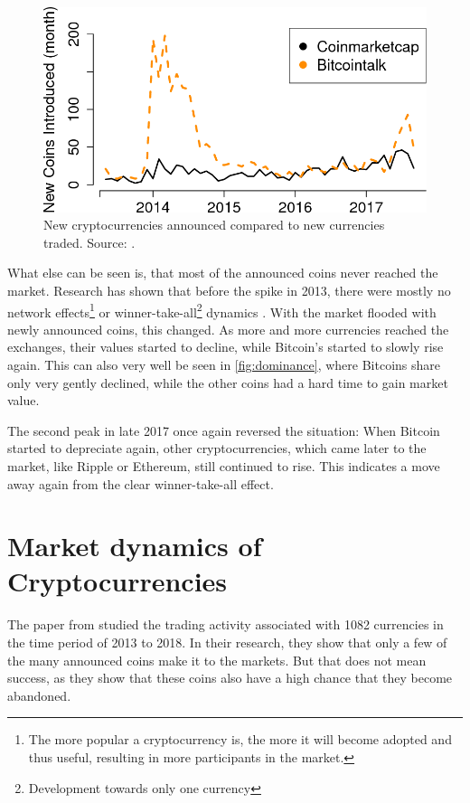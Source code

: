 \documentclass[11pt,a4paper,compsoc,conference]{IEEEtran}
\begin{document}
\begin{figure}[ht]
    \centering
    \includegraphics[width=\linewidth,  draft=false]{figures/13-Figure6-1.png}
    \caption[Announced currencies vs traded]{New cryptocurrencies announced compared to new currencies traded. Source: \citep{Feder2018TheRA}.}
    \label{fig:announcedvstraded}
\end{figure}

What else can be seen is, that most of the announced coins never reached the market. Research has shown that before the spike in 2013, there were mostly no network effects\footnote{The more popular a cryptocurrency is, the more it will become adopted and thus useful, resulting in more participants in the market.} or winner-take-all\footnote{Development towards only one currency} dynamics \citep{predictwinner}. With the market flooded with newly announced coins, this changed. As more and more currencies reached the exchanges, their values started to decline, while Bitcoin's started to slowly rise again. This can also very well be seen in \autoref{fig:dominance}, where Bitcoins share only very gently declined, while the other coins had a hard time to gain market value.  

The second peak in late 2017 once again reversed the situation: When Bitcoin started to depreciate again, other cryptocurrencies, which came later to the market, like Ripple or Ethereum, still continued to rise. This indicates a move away again from the clear winner-take-all effect. 

\section{Market dynamics of Cryptocurrencies}
The paper from \citet{Feder2018TheRA} studied the trading activity associated with 1082 currencies in the time period of 2013 to 2018. In their research, they show that only a few of the many announced coins make it to the markets. But that does not mean success, as they show that these coins also have a high chance that they become abandoned.
\end{document}
